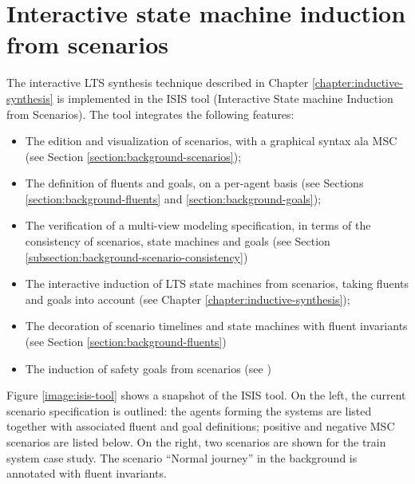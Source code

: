 \section{Interactive state machine induction from scenarios\label{section:tool-support-isis}}

The interactive LTS synthesis technique described in Chapter \ref{chapter:inductive-synthesis} is implemented in the ISIS tool (Interactive State machine Induction from Scenarios). The tool integrates the following features:

\begin{itemize}
\item The edition and visualization of scenarios, with a graphical syntax ala MSC (see Section \ref{section:background-scenarios});
\item The definition of fluents and goals, on a per-agent basis (see Sections \ref{section:background-fluents} and \ref{section:background-goals});
\item The verification of a multi-view modeling specification, in terms of the consistency of scenarios, state machines and goals (see Section \ref{subsection:background-scenario-consistency})
\item The interactive induction of LTS state machines from scenarios, taking fluents and goals into account (see Chapter \ref{chapter:inductive-synthesis});
\item The decoration of scenario timelines and state machines with fluent invariants (see Section \ref{section:background-fluents})
\item The induction of safety goals from scenarios (see \cite{Damas:2011})
\end{itemize}

Figure \ref{image:isis-tool} shows a snapshot of the ISIS tool. On the left, the current scenario specification is outlined: the agents forming the systems are listed together with associated fluent and goal definitions; positive and negative MSC scenarios are listed below. On the right, two scenarios are shown for the train system case study. The scenario ``Normal journey'' in the background is annotated with fluent invariants.


